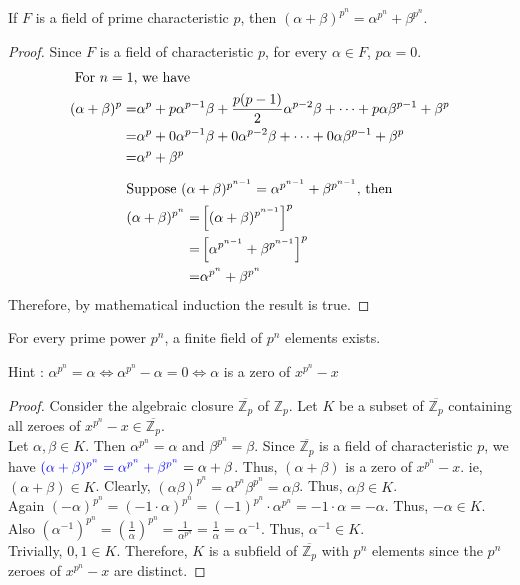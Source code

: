 \begin{lemma}
	If $F$ is a field of prime characteristic $p$, then $(\alpha+\beta)^{p^n} = \alpha^{p^n} + \beta^{p^n}$.
\end{lemma}
\begin{proof}
	Since $F$ is a field of characteristic $p$, for every $\alpha \in F$, $p\alpha = 0$.
	\begin{align*}
		\intertext{ For $n=1$, we have }
		(\alpha+\beta)^p = & \alpha^p + p \alpha^{p-1}\beta+ \frac{p(p-1)}{2} \alpha^{p-2} \beta + \dots + p \alpha \beta^{p-1} + \beta^p \\
		= &  \alpha^p + 0 \alpha^{p-1}\beta+ 0 \alpha^{p-2} \beta + \dots + 0 \alpha \beta^{p-1} + \beta^p \\
		= & \alpha^p + \beta^p
	\end{align*}
	\begin{align*}
		\intertext{Suppose $(\alpha+\beta)^{p^{n-1}} = \alpha^{p^{n-1}} + \beta^{p^{n-1}}$, then} 
		(\alpha+\beta)^{p^n} = & \left[ (\alpha+\beta)^{p^{n-1}} \right]^p \\
		= & \left[ \alpha^{p^{n-1}} + \beta^{p^{n-1}} \right]^p \\
		= & \alpha^{p^n} + \beta^{p^n}
	\end{align*}
	Therefore, by mathematical induction the result is true.
\end{proof}

\begin{theorem}
	For every prime power $p^n$, a finite field of $p^n$ elements exists.
\end{theorem}
{\color{blue} Hint : $\alpha^{p^n} = \alpha \iff \alpha^{p^n} - \alpha = 0 \iff \alpha$ is a zero of $x^{p^n} - x$}
\begin{proof}
	Consider the algebraic closure $\overline{\mathbb{Z}_p}$ of $\mathbb{Z}_p$. Let $K$ be a subset of $\overline{\mathbb{Z}_p}$ containing all zeroes of $x^{p^n}-x \in \overline{\mathbb{Z}_p}$.\\
	
	Let $\alpha, \beta \in K$. Then $\alpha^{p^n} = \alpha$ and $\beta^{p^n} = \beta$. Since $\overline{\mathbb{Z}_p}$ is a field of characteristic $p$, we have ${\color{blue}(\alpha+\beta)^{p^n} = \alpha^{p^n}+ \beta^{p^n}} = \alpha + \beta$. Thus, $(\alpha+\beta)$ is a zero of $x^{p^n}-x$. ie, $(\alpha + \beta) \in K$. Clearly, $(\alpha\beta)^{p^n} = \alpha^{p^n} \beta^{p^n} = \alpha\beta$. Thus, $\alpha\beta \in K$.\\

	Again $(-\alpha)^{p^n} = (-1 \cdot \alpha)^{p^n} = (-1)^{p^n} \cdot \alpha^{p^n} = -1 \cdot \alpha = -\alpha$. Thus, $-\alpha \in K$. Also $(\alpha^{-1})^{p^n} = \left( \frac{1}{\alpha} \right)^{p^n} = \frac{1}{\alpha^{p^n}} = \frac{1}{\alpha} = \alpha^{-1}$. Thus, $\alpha^{-1} \in K$.\\

	Trivially, $0,1 \in K$. Therefore, $K$ is a subfield of $\overline{\mathbb{Z}_p}$ with $p^n$ elements since {\color{blue}the $p^n$ zeroes of $x^{p^n}-x$ are distinct}.
\end{proof}

